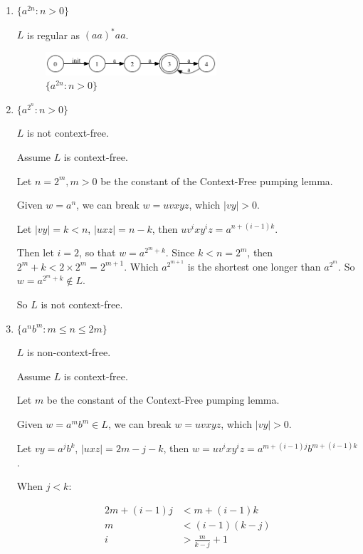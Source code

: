 \documentclass[paper=a4, fontsize=11pt]{scrartcl} %
\begin{document}
\begin{enumerate}
\item $\{a^{2n} : n>0\}$

  $L$ is regular as $(aa)^*aa$.

  \begin{figure}[hp]
    \centering
    \includegraphics[width=0.6\textwidth]{6-1.gv.png}
    \caption{$\{a^{2n} : n>0\}$}
  \end{figure}

\item $\{a^{2^n} : n>0\}$

  $L$ is not context-free.

  Assume $L$ is context-free.

  Let $n = 2^m, m>0$ be the constant of the Context-Free pumping
  lemma.

  Given $w = a^{n}$, we can break $w = uvxyz$, which $|vy|>0$.

  Let $|vy| = k<n$, $|uxz| = n-k$, then $uv^{i}xy^{i}z = a^{n+(i-1)k}$.

  Then let $i=2$, so that $w=a^{2^{m}+k}$.
  Since $k<n=2^{m}$, then $2^{m}+k<2\times 2^{m}=2^{m+1}$.
  Which $a^{2^{m+1}}$ is the shortest one longer than $a^{2^m}$.
  So $w = a^{2^{m}+k}\not\in L$.

  So $L$ is not context-free.

\item $\{a^{n}b^{m} : m\leq n\leq 2m \}$

  $L$ is non-context-free.

  Assume $L$ is context-free.

  Let $m$ be the constant of the Context-Free pumping lemma.

  Given $w = a^{m}b^{m} \in L$, we can break $w=uvxyz$, which
  $|vy|>0$.

  Let $vy = a^{j}b^{k}$, $|uxz| = 2m-j-k$, then $w = uv^{i}xy^{i}z =
  a^{m+(i-1)j}b^{m+(i-1)k}$.

  When $j<k$:

  \begin{equation}
    \begin{split}
      2m+(i-1)j &< m+(i-1)k\\
      m &< (i-1)(k-j)\\
      i &> \frac{m}{k-j}+1
    \end{split}
  \end{equation}


\end{enumerate}
\end{document}
